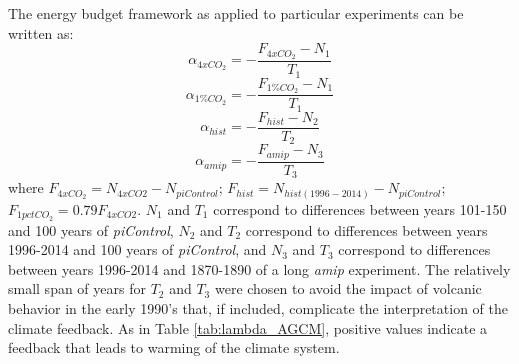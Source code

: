 \documentclass[draft]{agujournal2019}
\begin{document}
The energy budget framework as applied to particular experiments can be written as:
\begin{equation}
  \alpha_{4xCO_2}=-\frac{F_{4xCO_2}-N_1}{T_1}
\end{equation}
\begin{equation}
  \alpha_{1\%CO_2}=-\frac{F_{1\%CO_2}-N_1}{T_1}
\end{equation}
\begin{equation}
  \alpha_{hist}=-\frac{F_{hist}-N_2}{T_2}
\end{equation}
\begin{equation}
  \alpha_{amip}=-\frac{F_{amip}-N_3}{T_3}
\end{equation}
where $F_{4xCO_2}=N_{4xCO2}-N_{piControl}$; $F_{hist}=N_{hist(1996-2014)}-N_{piControl}$; 
$F_{1pctCO_2}=0.79F_{4xCO2}$.  
$N_1$ and $T_1$ correspond to differences between years 101-150 and 100 years of \textit{piControl}, $N_2$ and $T_2$ correspond to differences between years 1996-2014 and 100 years of \textit{piControl}, and $N_3$ and $T_3$ correspond to differences between years 1996-2014 and 1870-1890 of a long \textit{amip} experiment.  
The relatively small span of years for $T_2$ and $T_3$ were chosen to avoid the impact of volcanic behavior in the early 1990's 
that, if included, complicate the interpretation of the climate feedback.  
As in Table \ref{tab:lambda_AGCM}, positive values indicate a feedback that leads to warming of the climate system.  
\end{document}
